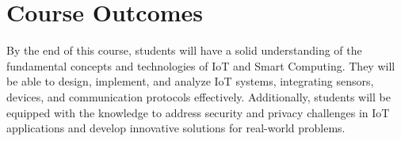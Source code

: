 
\section{Course Outcomes}


By the end of this course, students will have a solid understanding of the fundamental concepts and technologies of IoT and Smart Computing. 
They will be able to design, implement, and analyze IoT systems, integrating sensors, devices, and communication protocols effectively. 
Additionally, students will be equipped with the knowledge to address security and privacy challenges in IoT applications and develop innovative solutions for real-world problems.
